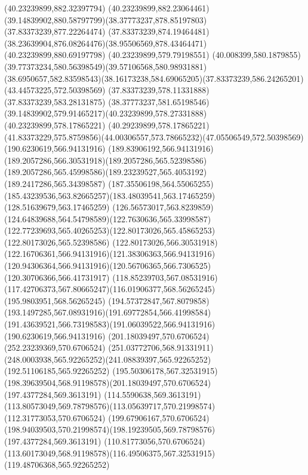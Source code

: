 {{		\lineto(40.23239899,882.32397794)
		\lineto(40.23239899,882.23064461)
		\curveto(39.14839902,880.58797799)(38.37773237,878.85197803)(37.83373239,877.22264474)
		\closepath
		\moveto(37.83373239,874.19464481)
		\curveto(38.23639904,876.08264476)(38.95506569,878.43464471)(40.23239899,880.69197798)
		\lineto(40.23239899,579.79198551)
		\curveto(40.008399,580.1879855)(39.77373234,580.56398549)(39.57106568,580.98931881)
		\curveto(38.6950657,582.83598543)(38.16173238,584.69065205)(37.83373239,586.24265201)
		\closepath
		\moveto(43.44573225,572.50398569)
		\lineto(37.83373239,578.11331888)
		\lineto(37.83373239,583.28131875)
		\curveto(38.37773237,581.65198546)(39.14839902,579.91465217)(40.23239899,578.27331888)
		\lineto(40.23239899,578.17865221)
		\lineto(40.29239899,578.17865221)
		\curveto(41.83373229,575.8759856)(44.00306557,573.78665232)(47.05506549,572.50398569)
		\closepath
		\moveto(190.6230619,566.94131916)
		\curveto(189.83906192,566.94131916)(189.2057286,566.30531918)(189.2057286,565.52398586)
		\curveto(189.2057286,565.45998586)(189.23239527,565.4053192)(189.2417286,565.34398587)
		\curveto(187.35506198,564.55065255)(185.43239536,563.82665257)(183.48039541,563.17465259)
		\lineto(128.51639679,563.17465259)
		\curveto(126.56573017,563.8239859)(124.64839688,564.54798589)(122.7630636,565.33998587)
		\curveto(122.77239693,565.40265253)(122.80173026,565.45865253)(122.80173026,565.52398586)
		\curveto(122.80173026,566.30531918)(122.16706361,566.94131916)(121.38306363,566.94131916)
		\curveto(120.94306364,566.94131916)(120.56706365,566.7306525)(120.30706366,566.41731917)
		\curveto(118.85239703,567.08531916)(117.42706373,567.80665247)(116.01906377,568.56265245)
		\lineto(195.9803951,568.56265245)
		\curveto(194.57372847,567.8079858)(193.1497285,567.08931916)(191.69772854,566.41998584)
		\curveto(191.43639521,566.73198583)(191.06039522,566.94131916)(190.6230619,566.94131916)
		\moveto(201.18039497,570.6706524)
		\lineto(252.23239369,570.6706524)
		\curveto(251.03772706,568.91331911)(248.0003938,565.92265252)(241.08839397,565.92265252)
		\lineto(192.51106185,565.92265252)
		\curveto(195.50306178,567.32531915)(198.39639504,568.91198578)(201.18039497,570.6706524)
		\moveto(197.4377284,569.3613191)
		\lineto(114.5590638,569.3613191)
		\curveto(113.80573049,569.78798576)(113.05639717,570.21998574)(112.31773053,570.6706524)
		\lineto(199.67906167,570.6706524)
		\curveto(198.94039503,570.21998574)(198.19239505,569.78798576)(197.4377284,569.3613191)
		\moveto(110.81773056,570.6706524)
		\curveto(113.60173049,568.91198578)(116.49506375,567.32531915)(119.48706368,565.92265252)
}}
